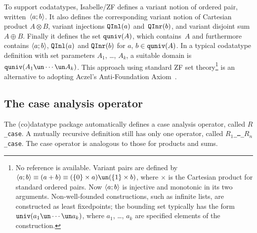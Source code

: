To support codatatypes, Isabelle/ZF defines a variant notion of ordered
pair, written~$\langle a;b\rangle$.  It also defines the corresponding variant
notion of Cartesian product $A\otimes B$, variant injections ${\tt QInl}(a)$
and~${\tt QInr}(b)$, and variant disjoint sum $A\oplus B$.  Finally it defines
the set ${\tt quniv}(A)$, which contains~$A$ and furthermore contains
$\langle a;b\rangle$, ${\tt QInl}(a)$ and ${\tt QInr}(b)$ for $a$, $b\in{\tt quniv}(A)$.  In a
typical codatatype definition with set parameters $A_1$, \ldots, $A_k$, a
suitable domain is $\quniv(A_1\un\cdots\un A_k)$.  This approach using
standard ZF set theory\footnote{No reference is available.  Variant pairs
  are defined by $\pair{a;b}\equiv (a+b) \equiv (\{0\}\times a) \un
  (\{1\}\times b)$, where $\times$ is the Cartesian product for standard
  ordered pairs.  Now
  $\langle a;b\rangle$ is injective and monotonic in its two arguments.
  Non-well-founded constructions, such as infinite lists, are constructed
  as least fixedpoints; the bounding set typically has the form
  $\univ(a_1\un\cdots\un a_k)$, where $a_1$, \ldots, $a_k$ are specified
  elements of the construction.}
is an alternative to adopting Aczel's Anti-Foundation
Axiom~\cite{aczel88}.

\subsection{The case analysis operator}
The (co)datatype package automatically defines a case analysis operator,
called {\tt$R$\_case}.  A mutually recursive definition still has only
one operator, called {\tt$R_1$\_\ldots\_$R_n$\_case}.  The case operator is
analogous to those for products and sums.  

